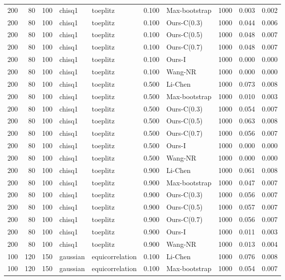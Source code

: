 \begin{tabular}{rrrllrlrrr}
200 & 80 & 100 & chisq1 & toeplitz & 0.100 & Max-bootstrap & 1000 & 0.003 & 0.002 \\
200 & 80 & 100 & chisq1 & toeplitz & 0.100 & Ours-C(0.3) & 1000 & 0.044 & 0.006 \\
200 & 80 & 100 & chisq1 & toeplitz & 0.100 & Ours-C(0.5) & 1000 & 0.048 & 0.007 \\
200 & 80 & 100 & chisq1 & toeplitz & 0.100 & Ours-C(0.7) & 1000 & 0.048 & 0.007 \\
200 & 80 & 100 & chisq1 & toeplitz & 0.100 & Ours-I & 1000 & 0.000 & 0.000 \\
200 & 80 & 100 & chisq1 & toeplitz & 0.100 & Wang-NR & 1000 & 0.000 & 0.000 \\
200 & 80 & 100 & chisq1 & toeplitz & 0.500 & Li-Chen & 1000 & 0.073 & 0.008 \\
200 & 80 & 100 & chisq1 & toeplitz & 0.500 & Max-bootstrap & 1000 & 0.010 & 0.003 \\
200 & 80 & 100 & chisq1 & toeplitz & 0.500 & Ours-C(0.3) & 1000 & 0.054 & 0.007 \\
200 & 80 & 100 & chisq1 & toeplitz & 0.500 & Ours-C(0.5) & 1000 & 0.063 & 0.008 \\
200 & 80 & 100 & chisq1 & toeplitz & 0.500 & Ours-C(0.7) & 1000 & 0.056 & 0.007 \\
200 & 80 & 100 & chisq1 & toeplitz & 0.500 & Ours-I & 1000 & 0.000 & 0.000 \\
200 & 80 & 100 & chisq1 & toeplitz & 0.500 & Wang-NR & 1000 & 0.000 & 0.000 \\
200 & 80 & 100 & chisq1 & toeplitz & 0.900 & Li-Chen & 1000 & 0.061 & 0.008 \\
200 & 80 & 100 & chisq1 & toeplitz & 0.900 & Max-bootstrap & 1000 & 0.047 & 0.007 \\
200 & 80 & 100 & chisq1 & toeplitz & 0.900 & Ours-C(0.3) & 1000 & 0.056 & 0.007 \\
200 & 80 & 100 & chisq1 & toeplitz & 0.900 & Ours-C(0.5) & 1000 & 0.057 & 0.007 \\
200 & 80 & 100 & chisq1 & toeplitz & 0.900 & Ours-C(0.7) & 1000 & 0.056 & 0.007 \\
200 & 80 & 100 & chisq1 & toeplitz & 0.900 & Ours-I & 1000 & 0.011 & 0.003 \\
200 & 80 & 100 & chisq1 & toeplitz & 0.900 & Wang-NR & 1000 & 0.013 & 0.004 \\
100 & 120 & 150 & gaussian & equicorrelation & 0.100 & Li-Chen & 1000 & 0.076 & 0.008 \\
100 & 120 & 150 & gaussian & equicorrelation & 0.100 & Max-bootstrap & 1000 & 0.054 & 0.007 \\

\end{tabular}
